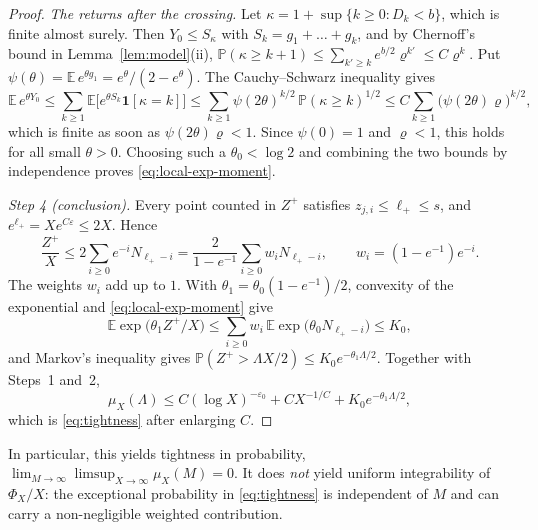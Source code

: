\begin{proof}
\emph{The returns after the crossing.} Let
$\kappa=1+\sup\{k\ge0:D_k<b\}$, which is finite almost surely. Then
$Y_0\le S_\kappa$ with $S_k=g_1+\dots+g_k$, and by Chernoff's bound in
Lemma~\ref{lem:model}(ii),
$\mathbb P(\kappa\ge k+1)\le\sum_{k'\ge k}e^{b/2}\varrho^{k'}
\le C\varrho^{k}$. Put
$\psi(\theta)=\mathbb E\,e^{\theta g_1}=e^\theta/(2-e^\theta)$. The
Cauchy--Schwarz inequality gives
\[
 \mathbb E\,e^{\theta Y_0}
 \le\sum_{k\ge1}\mathbb E\bigl[e^{\theta S_k}\mathbf 1[\kappa=k]\bigr]
 \le\sum_{k\ge1}\psi(2\theta)^{k/2}\,\mathbb P(\kappa\ge k)^{1/2}
 \le C\sum_{k\ge1}\bigl(\psi(2\theta)\varrho\bigr)^{k/2},
\]
which is finite as soon as $\psi(2\theta)\varrho<1$. Since $\psi(0)=1$
and $\varrho<1$, this holds for all small $\theta>0$. Choosing such a
$\theta_0<\log 2$ and combining the two bounds by independence proves
\eqref{eq:local-exp-moment}.

\emph{Step 4 (conclusion).} Every point counted in $Z^+$ satisfies
$z_{j,i}\le\ell_+\le s$, and $e^{\ell_+}=Xe^{C\varepsilon}\le2X$. Hence
\[
 \frac{Z^+}{X}\le2\sum_{i\ge0}e^{-i}N_{\ell_+-i}
 =\frac{2}{1-e^{-1}}\sum_{i\ge0}w_iN_{\ell_+-i},
 \qquad w_i=(1-e^{-1})e^{-i}.
\]
The weights $w_i$ add up to $1$. With
$\theta_1=\theta_0(1-e^{-1})/2$, convexity of the exponential and
\eqref{eq:local-exp-moment} give
\[
 \mathbb E\exp\bigl(\theta_1Z^+/X\bigr)
 \le\sum_{i\ge0}w_i\,\mathbb E\exp\bigl(\theta_0N_{\ell_+-i}\bigr)\le K_0,
\]
and Markov's inequality gives
$\mathbb P(Z^+>\Lambda X/2)\le K_0e^{-\theta_1\Lambda/2}$.
Together with Steps~1 and~2,
\[
 \mu_X(\Lambda)\le C(\log X)^{-\varepsilon_0}+CX^{-1/C}
   +K_0e^{-\theta_1\Lambda/2},
\]
which is \eqref{eq:tightness} after enlarging $C$.
\end{proof}

\noindent
In particular, this yields tightness in probability,
$\lim_{M\to\infty}\limsup_{X\to\infty}\mu_X(M)=0$.
It does \emph{not} yield uniform integrability of $\Phi_X/X$:
the exceptional probability in \eqref{eq:tightness} is independent
of $M$ and can carry a non-negligible weighted contribution.


